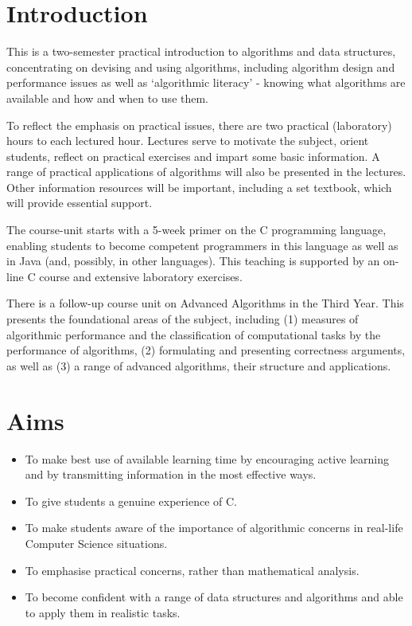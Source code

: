 \section*{Introduction}

This is a two-semester practical introduction to algorithms and data structures,
concentrating on devising and using algorithms, including algorithm design and
performance issues as well as `algorithmic literacy' - knowing what algorithms
are available and how and when to use them.

To reflect the emphasis on practical issues, there are two practical
(laboratory) hours to each lectured hour. Lectures serve to motivate the
subject, orient students, reflect on practical exercises and impart some basic
information. A range of practical applications of algorithms will also be
presented in the lectures. Other information resources will be important,
including a set textbook, which will provide essential support.

The course-unit starts with a 5-week primer on the C programming language,
enabling students to become competent programmers in this language as well as in
Java (and, possibly, in other languages). This teaching is supported by an on-
line C course and extensive laboratory exercises.

There is a follow-up course unit on Advanced Algorithms in the Third Year. This
presents the foundational areas of the subject, including (1) measures of
algorithmic performance and the classification of computational tasks by the
performance of algorithms, (2) formulating and presenting correctness arguments,
as well as (3) a range of advanced algorithms, their structure and applications.

\section*{Aims}

\begin{itemize}
\item To make best use of available learning time by encouraging active learning
      and by transmitting information in the most effective ways.
\item To give students a genuine experience of C.
\item To make students aware of the importance of algorithmic concerns in
      real-life Computer Science situations.
\item To emphasise practical concerns, rather than mathematical analysis.
\item To become confident with a range of data structures and algorithms and
      able to apply them in realistic tasks.
\end{itemize}

